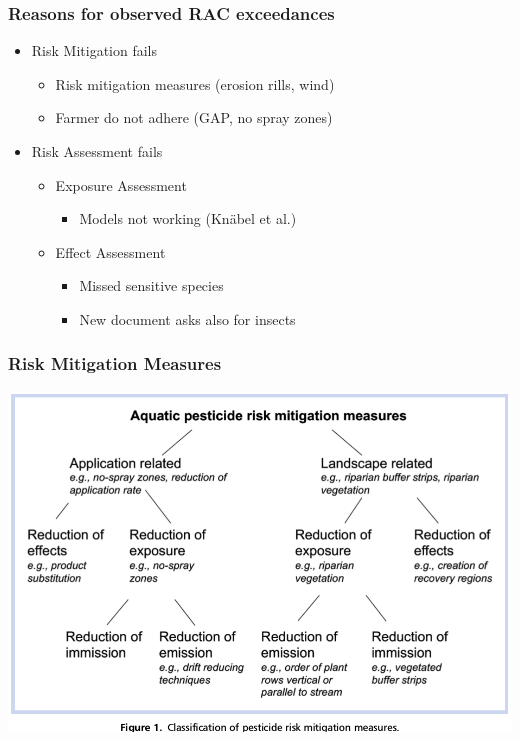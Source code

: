 \documentclass[
	12pt
	]{beamer}
\begin{document}
\begin{frame}
\frametitle{Reasons for observed RAC exceedances}
	\begin{itemize}
		\item Risk Mitigation fails
			\begin{itemize}
				\item Risk mitigation measures (erosion rills, wind)
				\item Farmer do not adhere (GAP, no spray zones)
			\end{itemize}
		\item Risk Assessment fails
			\begin{itemize}
				\item Exposure Assessment
					\begin{itemize}
						\item Models not working (Knäbel et al.)
					\end{itemize}
				\item Effect Assessment
					\begin{itemize}
						\item Missed sensitive species
						\item New document asks also for insects
					\end{itemize}
			\end{itemize}

	\end{itemize}
\end{frame}


{%
\begin{frame}
\frametitle{Risk Mitigation Measures}
	    	    	\includegraphics[height=0.8\textheight]{figs/bereswill_2014_fig1.png}
\end{frame}
}
\end{document}
